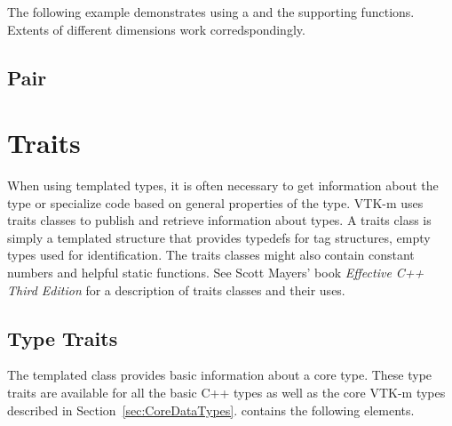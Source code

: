 The following example demonstrates using a  and the
supporting functions. Extents of different dimensions work
corredspondingly.


\subsection{Pair}




\section{Traits}
\label{sec:Traits}


When using templated types, it is often necessary to get information about
the type or specialize code based on general properties of the type. VTK-m
uses traits classes to publish and retrieve information about types. A
traits class is simply a templated structure that provides typedefs for
tag structures, empty types used for identification. The traits
classes might also contain constant numbers and helpful static
functions. See Scott Mayers' book {\it Effective C++ Third Edition} for a
description of traits classes and their uses.

\subsection{Type Traits}

The  templated class provides basic information
about a core type. These type traits are available for all the basic C++
types as well as the core VTK-m types described in
Section~\ref{sec:CoreDataTypes}.  contains the following
elements.

